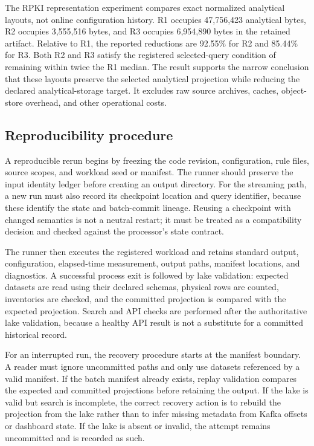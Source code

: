 The RPKI representation experiment compares exact normalized analytical layouts, not online configuration history. R1 occupies 47,756,423 analytical bytes, R2 occupies 3,555,516 bytes, and R3 occupies 6,954,890 bytes in the retained artifact. Relative to R1, the reported reductions are 92.55\% for R2 and 85.44\% for R3. Both R2 and R3 satisfy the registered selected-query condition of remaining within twice the R1 median. The result supports the narrow conclusion that these layouts preserve the selected analytical projection while reducing the declared analytical-storage target. It excludes raw source archives, caches, object-store overhead, and other operational costs.

\subsection{Reproducibility procedure}

A reproducible rerun begins by freezing the code revision, configuration, rule files, source scopes, and workload seed or manifest. The runner should preserve the input identity ledger before creating an output directory. For the streaming path, a new run must also record its checkpoint location and query identifier, because these identify the state and batch-commit lineage. Reusing a checkpoint with changed semantics is not a neutral restart; it must be treated as a compatibility decision and checked against the processor's state contract.

The runner then executes the registered workload and retains standard output, configuration, elapsed-time measurement, output paths, manifest locations, and diagnostics. A successful process exit is followed by lake validation: expected datasets are read using their declared schemas, physical rows are counted, inventories are checked, and the committed projection is compared with the expected projection. Search and API checks are performed after the authoritative lake validation, because a healthy API result is not a substitute for a committed historical record.

For an interrupted run, the recovery procedure starts at the manifest boundary. A reader must ignore uncommitted paths and only use datasets referenced by a valid manifest. If the batch manifest already exists, replay validation compares the expected and committed projections before retaining the output. If the lake is valid but search is incomplete, the correct recovery action is to rebuild the projection from the lake rather than to infer missing metadata from Kafka offsets or dashboard state. If the lake is absent or invalid, the attempt remains uncommitted and is recorded as such.

